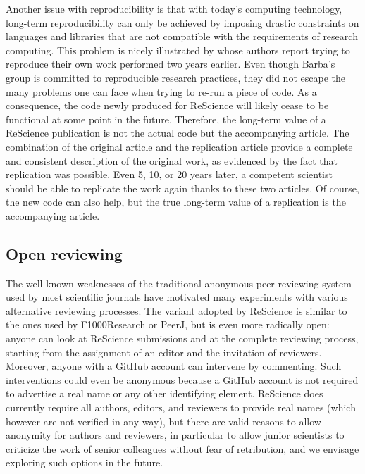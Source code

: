 \documentclass[a4paper,10pt, twocolumn]{article}
\begin{document}
Another issue with reproducibility is that with today's computing
technology, long-term reproducibility can only be achieved by imposing
drastic constraints on languages and libraries that are not compatible
with the requirements of research computing. This problem is nicely
illustrated by \citep{Mesnard:2016} whose authors report trying to
reproduce their own work performed two years earlier. Even though
Barba's group is committed to reproducible research practices, they
did not escape the many problems one can face when trying to re-run a
piece of code. As a consequence, the code newly produced for ReScience
will likely cease to be functional at some point in the future.
Therefore, the long-term value of a ReScience publication is not the
actual code but the accompanying article. The combination of the
original article and the replication article provide a complete and
consistent description of the original work, as evidenced by the fact
that replication was possible. Even 5, 10, or 20 years later, a
competent scientist should be able to replicate the work again thanks
to these two articles. Of course, the new code can also help, but the
true long-term value of a replication is the accompanying article.\\

\subsection*{Open reviewing}

The well-known weaknesses of the traditional anonymous peer-reviewing
system used by most scientific journals have motivated many
experiments with various alternative reviewing processes. The variant
adopted by ReScience is similar to the ones used by F1000Research or
PeerJ, but is even more radically open: anyone can look at ReScience
submissions and at the complete reviewing process, starting from the
assignment of an editor and the invitation of reviewers. Moreover,
anyone with a GitHub account can intervene by commenting. Such
interventions could even be anonymous because a GitHub account is not
required to advertise a real name or any other identifying
element. ReScience does currently require all authors, editors, and
reviewers to provide real names (which however are not verified in any
way), but there are valid reasons to allow anonymity for authors and
reviewers, in particular to allow junior scientists to criticize the
work of senior colleagues without fear of retribution, and we envisage
exploring such options in the future.
\end{document}
